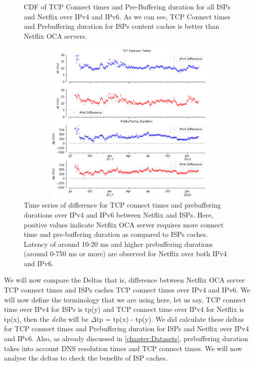 \begin{figure}
\begin{minipage}{0.5\textwidth}
	\end{minipage}
	\caption[All ISPs Connect Time and Prebuffering Duration CDF Absolute]{CDF of TCP Connect times and Pre-Buffering duration for all ISPs and Netflix over IPv4 and IPv6. As we can see, TCP Connect times and Prebuffering duration for ISPs content caches is better than Netflix OCA servers.}
	\label{fig:ALL ISPs Connect Time and Prebuffering Duration CDF Absolute}
\end{figure}

\FloatBarrier

\begin{figure}[!ht]
	\centering
	\includegraphics[keepaspectratio, height=8cm, width=15cm]{figures/cache/allisps/netflix-tcp-pd-delay-timeseries-all-isp.png}
	\caption[All ISPs TCP Connect Times and Pre-Buffering Duration Timeseries Deltas]{Time series of difference for TCP connect times and prebuffering durations over IPv4 and IPv6 between Netflix and ISPs. 
	Here, positive values indicate Netflix OCA server requires more connect time and pre-buffering duration as compared to ISPs caches. 
	Latency of around 10-20 ms and higher prebuffering durations (around 0-750 ms or more) are observed for Netflix over both IPv4 and IPv6.}
	\label{fig:All ISPs TCP Connect Times and Pre-Buffering Duration Timeseries Deltas}
\end{figure}

We will now compare the Deltas that is, difference between Netflix OCA server TCP connect times and ISPs caches TCP connect times over IPv4 and IPv6. We will now define the
terminology that we are using here, let us say, TCP connect time over IPv4 for ISPs is tp(y) and TCP connect time over IPv4 for Netflix is tp(x), then the \textit{delta} will be $\Delta$tp = tp(x) - tp(y). 
We did calculate these deltas for TCP connect times and Prebuffering duration for ISPs and Netflix over IPv4 and IPv6.
Also, as already discussed in \cref{chapter:Datasets}, prebuffering duration takes into account DNS resolution times and TCP connect times. 
We will now analyse the deltas to check the benefits of ISP caches.

